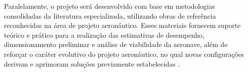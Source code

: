 Paralelamente, o projeto será desenvolvido com base em metodologias consolidadas da literatura especializada, utilizando obras de referência reconhecidas na área de projeto aeronáutico. Esses materiais fornecem suporte teórico e prático para a realização das estimativas de desempenho, dimensionamento preliminar e análise de viabilidade da aeronave, além de reforçar o caráter evolutivo do projeto aeronáutico, no qual novas configurações derivam e aprimoram soluções previamente estabelecidas \cite{gudmundsson2021, raymer2018, anderson1999}.